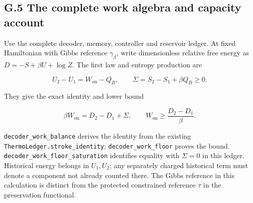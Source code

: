 \documentclass[
]{article}
\begin{document}
\subsection{G.5 The complete work algebra and capacity
account}\label{g.5-the-complete-work-algebra-and-capacity-account}

Use the complete decoder, memory, controller and reservoir ledger. At
fixed Hamiltonian with Gibbs reference \(\gamma_\beta\), write
dimensionless relative free energy as \(D=-S+\beta U+\log Z\). The first
law and entropy production are

\[
U_2-U_1=W_{\mathrm{on}}-Q_B,\qquad
\Sigma=S_2-S_1+\beta Q_B\ge0.
\]

They give the exact identity and lower bound

\[
\beta W_{\mathrm{on}}=D_2-D_1+\Sigma,\qquad
W_{\mathrm{on}}\ge\frac{D_2-D_1}{\beta}.
\]

\texttt{d\allowbreak{}e\allowbreak{}c\allowbreak{}o\allowbreak{}d\allowbreak{}e\allowbreak{}r\allowbreak{}\_\allowbreak{}w\allowbreak{}o\allowbreak{}r\allowbreak{}k\allowbreak{}\_\allowbreak{}b\allowbreak{}a\allowbreak{}l\allowbreak{}a\allowbreak{}n\allowbreak{}c\allowbreak{}e}
derives the identity from the existing
\texttt{T\allowbreak{}h\allowbreak{}e\allowbreak{}r\allowbreak{}m\allowbreak{}o\allowbreak{}L\allowbreak{}e\allowbreak{}d\allowbreak{}g\allowbreak{}e\allowbreak{}r\allowbreak{}.\allowbreak{}s\allowbreak{}t\allowbreak{}r\allowbreak{}o\allowbreak{}k\allowbreak{}e\allowbreak{}\_\allowbreak{}i\allowbreak{}d\allowbreak{}e\allowbreak{}n\allowbreak{}t\allowbreak{}i\allowbreak{}t\allowbreak{}y};
\texttt{d\allowbreak{}e\allowbreak{}c\allowbreak{}o\allowbreak{}d\allowbreak{}e\allowbreak{}r\allowbreak{}\_\allowbreak{}w\allowbreak{}o\allowbreak{}r\allowbreak{}k\allowbreak{}\_\allowbreak{}f\allowbreak{}l\allowbreak{}o\allowbreak{}o\allowbreak{}r}
proves the bound.
\texttt{d\allowbreak{}e\allowbreak{}c\allowbreak{}o\allowbreak{}d\allowbreak{}e\allowbreak{}r\allowbreak{}\_\allowbreak{}w\allowbreak{}o\allowbreak{}r\allowbreak{}k\allowbreak{}\_\allowbreak{}f\allowbreak{}l\allowbreak{}o\allowbreak{}o\allowbreak{}r\allowbreak{}\_\allowbreak{}s\allowbreak{}a\allowbreak{}t\allowbreak{}u\allowbreak{}r\allowbreak{}a\allowbreak{}t\allowbreak{}i\allowbreak{}o\allowbreak{}n}
identifies equality with \(\Sigma=0\) in this ledger. Historical energy
belongs in \(U_1,U_2\); any separately charged historical term must
denote a component not already counted there. The Gibbs reference in
this calculation is distinct from the protected constrained reference
\(\tau\) in the preservation functional.
\end{document}
